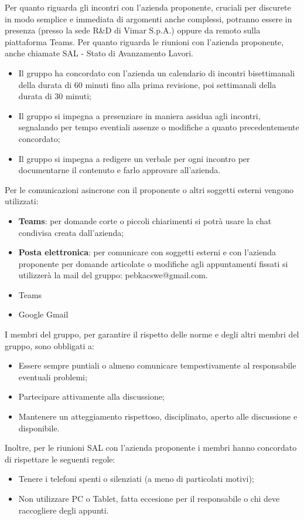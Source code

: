 Per quanto riguarda gli incontri con l'azienda proponente, cruciali per discurete in modo semplice e immediata di argomenti anche complessi, potranno essere in presenza (presso la sede R\&D di Vimar S.p.A.) oppure da remoto sulla piattaforma Teams. Per quanto riguarda le riunioni con l'azienda proponente, anche chiamate SAL - Stato di Avanzamento Lavori.
\begin{itemize}
    \item Il gruppo ha concordato con l'azienda un calendario di incontri bisettimanali della durata di 60 minuti fino alla prima revisione, poi settimanali della durata di 30 minuti;
    \item Il gruppo si impegna a presenziare in maniera assidua agli incontri, segnalando per tempo eventiali assenze o modifiche a quanto precedentemente concordato;
    \item Il gruppo si impegna a redigere un verbale per ogni incontro per documentarne il contenuto e farlo approvare all'azienda. 
\end{itemize}
Per le comunicazioni asincrone con il proponente o altri soggetti esterni vengono utilizzati:
\begin{itemize}
    \item \textbf{Teams}: per domande corte o piccoli chiarimenti si potrà usare la chat condivisa creata dall'azienda;
    \item \textbf{Posta elettronica}: per comunicare con soggetti esterni e con l'azienda proponente per domande articolate o modifiche agli appuntamenti fissati si utilizzerà la mail del gruppo: pebkacswe@gmail.com.
\end{itemize}
\begin{itemize}
    \item Teams
    \item Google Gmail
\end{itemize}


I membri del gruppo, per garantire il rispetto delle norme e degli altri membri del gruppo, sono obbligati a:
\begin{itemize}
    \item Essere sempre puntiali o almeno comunicare tempestivamente al responsabile eventuali problemi;
    \item Partecipare attivamente alla discussione;
    \item Mantenere un atteggiamento rispettoso, disciplinato, aperto alle discussione e disponibile.
\end{itemize}
Inoltre, per le riunioni SAL con l'azienda proponente i membri hanno concordato di rispettare le seguenti regole:
\begin{itemize}
    \item Tenere i telefoni spenti o silenziati (a meno di particolati motivi);
    \item Non utilizzare PC o Tablet, fatta eccesione per il responsabile o chi deve raccogliere degli appunti.
\end{itemize}